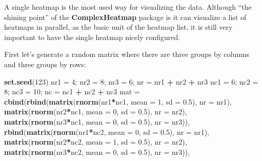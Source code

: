 \documentclass[]{book}
\newenvironment{Shaded}{\begin{snugshade}}{\end{snugshade}}
\newcommand{\KeywordTok}[1]{\textcolor[rgb]{0.13,0.29,0.53}{\textbf{#1}}}
\newcommand{\DataTypeTok}[1]{\textcolor[rgb]{0.13,0.29,0.53}{#1}}
\newcommand{\DecValTok}[1]{\textcolor[rgb]{0.00,0.00,0.81}{#1}}
\newcommand{\FloatTok}[1]{\textcolor[rgb]{0.00,0.00,0.81}{#1}}
\newcommand{\StringTok}[1]{\textcolor[rgb]{0.31,0.60,0.02}{#1}}
\newcommand{\OperatorTok}[1]{\textcolor[rgb]{0.81,0.36,0.00}{\textbf{#1}}}
\newcommand{\NormalTok}[1]{#1}
\theoremstyle{definition}
\theoremstyle{definition}
\theoremstyle{definition}
\theoremstyle{remark}
\begin{document}
A single heatmap is the most used way for visualizing the data. Although
``the shining point'' of the \textbf{ComplexHeatmap} package is it can
visualize a list of heatmaps in parallel, as the basic unit of the
heatmap list, it is still very important to have the single heatmap
nicely configured.

First let's generate a random matrix where there are three groups by
columns and three groups by rows:

\begin{Shaded}
\begin{Highlighting}[]
\KeywordTok{set.seed}\NormalTok{(}\DecValTok{123}\NormalTok{)}
\NormalTok{nr1 =}\StringTok{ }\DecValTok{4}\NormalTok{; nr2 =}\StringTok{ }\DecValTok{8}\NormalTok{; nr3 =}\StringTok{ }\DecValTok{6}\NormalTok{; nr =}\StringTok{ }\NormalTok{nr1 }\OperatorTok{+}\StringTok{ }\NormalTok{nr2 }\OperatorTok{+}\StringTok{ }\NormalTok{nr3}
\NormalTok{nc1 =}\StringTok{ }\DecValTok{6}\NormalTok{; nc2 =}\StringTok{ }\DecValTok{8}\NormalTok{; nc3 =}\StringTok{ }\DecValTok{10}\NormalTok{; nc =}\StringTok{ }\NormalTok{nc1 }\OperatorTok{+}\StringTok{ }\NormalTok{nc2 }\OperatorTok{+}\StringTok{ }\NormalTok{nc3}
\NormalTok{mat =}\StringTok{ }\KeywordTok{cbind}\NormalTok{(}\KeywordTok{rbind}\NormalTok{(}\KeywordTok{matrix}\NormalTok{(}\KeywordTok{rnorm}\NormalTok{(nr1}\OperatorTok{*}\NormalTok{nc1, }\DataTypeTok{mean =} \DecValTok{1}\NormalTok{,   }\DataTypeTok{sd =} \FloatTok{0.5}\NormalTok{), }\DataTypeTok{nr =}\NormalTok{ nr1),}
          \KeywordTok{matrix}\NormalTok{(}\KeywordTok{rnorm}\NormalTok{(nr2}\OperatorTok{*}\NormalTok{nc1, }\DataTypeTok{mean =} \DecValTok{0}\NormalTok{,   }\DataTypeTok{sd =} \FloatTok{0.5}\NormalTok{), }\DataTypeTok{nr =}\NormalTok{ nr2),}
          \KeywordTok{matrix}\NormalTok{(}\KeywordTok{rnorm}\NormalTok{(nr3}\OperatorTok{*}\NormalTok{nc1, }\DataTypeTok{mean =} \DecValTok{0}\NormalTok{,   }\DataTypeTok{sd =} \FloatTok{0.5}\NormalTok{), }\DataTypeTok{nr =}\NormalTok{ nr3)),}
    \KeywordTok{rbind}\NormalTok{(}\KeywordTok{matrix}\NormalTok{(}\KeywordTok{rnorm}\NormalTok{(nr1}\OperatorTok{*}\NormalTok{nc2, }\DataTypeTok{mean =} \DecValTok{0}\NormalTok{,   }\DataTypeTok{sd =} \FloatTok{0.5}\NormalTok{), }\DataTypeTok{nr =}\NormalTok{ nr1),}
          \KeywordTok{matrix}\NormalTok{(}\KeywordTok{rnorm}\NormalTok{(nr2}\OperatorTok{*}\NormalTok{nc2, }\DataTypeTok{mean =} \DecValTok{1}\NormalTok{,   }\DataTypeTok{sd =} \FloatTok{0.5}\NormalTok{), }\DataTypeTok{nr =}\NormalTok{ nr2),}
          \KeywordTok{matrix}\NormalTok{(}\KeywordTok{rnorm}\NormalTok{(nr3}\OperatorTok{*}\NormalTok{nc2, }\DataTypeTok{mean =} \DecValTok{0}\NormalTok{,   }\DataTypeTok{sd =} \FloatTok{0.5}\NormalTok{), }\DataTypeTok{nr =}\NormalTok{ nr3)),}

\end{Highlighting}
\end{Shaded}
\end{document}
